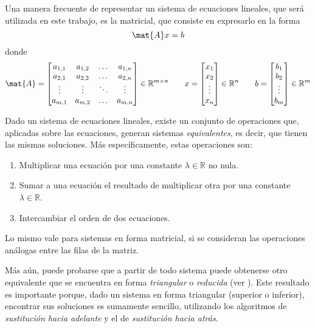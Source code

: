         Una manera frecuente de representar un sistema de ecuaciones lineales, que será utilizada en este trabajo, es la matricial, que consiste en expresarlo en la forma
        \[ \mat{A}x = b \]
        donde
        \[ \mat{A} = \left[ \begin{matrix} a_{1,1} & a_{1,2} & \dots  & a_{1,n} \\
                                           a_{2,1} & a_{2,2} & \dots  & a_{2,n} \\
                                           \vdots  & \vdots  & \ddots & \vdots  \\
                                           a_{m,1} & a_{m,2} & \dots  & a_{m,n} \\ \end{matrix} \right] \in \mathbb{R}^{m \times n} \qquad
        x = \left[ \begin{matrix} x_1 \\ x_2 \\ \vdots \\ x_n \end{matrix} \right] \in \mathbb{R}^n \qquad
        b = \left[ \begin{matrix} b_1 \\ b_2 \\ \vdots \\ b_m \end{matrix} \right] \in \mathbb{R}^m \]

        Dado un sistema de ecuaciones lineales, existe un conjunto de operaciones que, aplicadas sobre las ecuaciones, generan sistemas \emph{equivalentes}, es decir, que tienen las mismas soluciones. Más específicamente, estas operaciones son:
        \begin{enumerate}[label=(\alph*), nosep]
            \item Multiplicar una ecuación por una constante $\lambda \in \mathbb{R}$ no nula.
            \item Sumar a una ecuación el resultado de multiplicar otra por una constante $\lambda \in \mathbb{R}$.
            \item Intercambiar el orden de dos ecuaciones.
        \end{enumerate}

        Lo mismo vale para sistemas en forma matricial, si se consideran las operaciones análogas entre las filas de la matriz.

        Más aún, puede probarse que a partir de todo sistema puede obtenerse otro equivalente que se encuentra en forma \emph{triangular} o \emph{reducida} (ver \cite[p.~358]{burden}). Este resultado es importante porque, dado un sistema en forma triangular (superior o inferior), encontrar sus soluciones es sumamente sencillo, utilizando los algoritmos de \emph{sustitución hacia adelante} y el de \emph{sustitución hacia atrás}.

